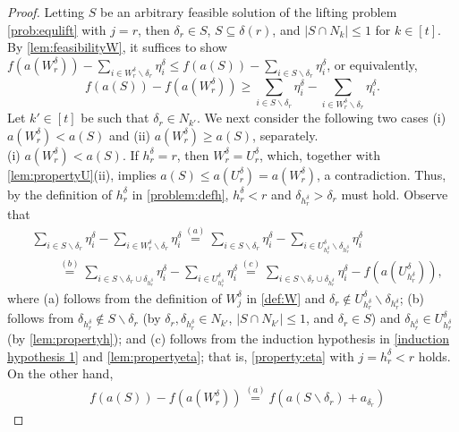 \documentclass[10pt,a4paper]{amsart}
\newcommand{\D}{\delta}
\begin{document}
\begin{proof}
	Letting $S$ be an arbitrary feasible solution of the lifting problem \eqref{prob:equlift} with $j=r$, then 
	$\D_r\in S$, $S\subseteq\D(r)$, and $|S \cap N_k |\leq 1$ for $k\in[t]$.
	By \cref{lem:feasibilityW}, it suffices to show $f(a(W^\D_r))-\sum_{i\in W^{\D}_r\backslash \D_r} \eta^\D_i \leq f(a(S))-\sum_{i\in S\backslash \D_r}\eta^\D_i$, 
	or equivalently, 
	\begin{equation}\label{ourgoal2}
		 f(a(S))-f(a(W^\D_r)) \geq \sum_{i\in S\backslash \D_r}\eta^\D_i-\sum_{i\in W^{\D}_r\backslash \D_r} \eta^\D_i.
	\end{equation}
	Let $k' \in [t]$ be such that  $\D_r\in N_{k'}$.
    We next consider the following two cases (i) $a(W^{\D}_r)<a(S)$ and (ii) $a(W^{\D}_r)\geq a(S)$, separately. \\[8pt]
	{(i)} $a(W^{\D}_r)<a(S)$.
 	If $h^\D_r=r$, then $W^\D_r=U^\D_r$, which, 
	together with \cref{lem:propertyU}(ii), implies $a(S)\leq a(U^{\D}_r)=a(W^{\D}_r)$,
	a contradiction.
	Thus, by the definition of $h^\D_r$ in \eqref{problem:defh}, $h^\D_r< r$ and $\D_{h^\D_r}> \D_{r}$ must hold.
	Observe that
	\begin{equation}\label{tmpeq1}
		\begin{aligned}
			 &\sum_{i\in S\backslash\D_r}
			\eta^{\D}_i-\sum_{i\in W^{\D}_{r}\backslash\D_{r}}\eta^{\D}_i
			 \stackrel{(a)}{=} \sum_{i\in S\backslash \D_r}
			\eta^{\D}_i-\sum_{i\in U^{\D}_{h^\D_r}\backslash\D_{h^\D_r}}\eta^{\D}_i \\
			&\qquad \stackrel{(b)}{=} \sum_{i\in S\backslash \D_r\cup\D_{h^\D_r}}
			\eta^{\D}_i-\sum_{i\in U^{\D}_{h^\D_r}}\eta^{\D}_i 
			\stackrel{(c)}{=}  \sum_{i\in S\backslash \D_r\cup\D_{h^\D_r}}\eta^{\D}_i-f(a(U^{\D}_{h^\D_r})),
		\end{aligned}
	\end{equation}
	where (a) follows from the definition of $W^\D_j$ in \eqref{def:W} and $\D_r\notin U^\D_{h^\D_r}\backslash \D_{h^\D_r}$;
	(b) follows from $\D_{h^\D_r}\notin S\backslash \D_r$ (by $\D_r,\D_{h^\D_r}\in N_{k'}$, $|S \cap N_{k'}|\leq 1$, and $\D_r \in S$) and $\D_{h^\D_r}\in U^{\D}_{h^\D_r}$ (by \cref{lem:propertyh});
	and (c) follows from the induction hypothesis in \eqref{induction hypothesis 1} and \cref{lem:propertyeta}; that is, \eqref{property:eta} with $j=h^\D_r<r$ holds.
	 On the other hand,
	 \begin{equation}\label{tmpeq2}
	 	\begin{aligned}
	 		&f(a(S))-f(a(W^{\D}_r)) \stackrel{(a)}{=} f(a(S\backslash \D_r)+a_{\D_r})

\end{aligned}
\end{equation}
\end{proof}
\end{document}
